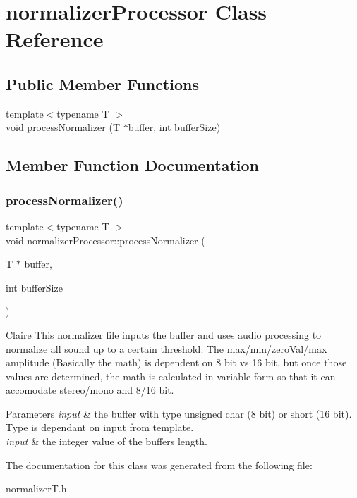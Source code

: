 \hypertarget{classnormalizerProcessor}{}\section{normalizer\+Processor Class Reference}
\label{classnormalizerProcessor}
\subsection*{Public Member Functions}
\begin{DoxyCompactItemize}
\item 
{\footnotesize template$<$typename T $>$ }\\void \hyperlink{classnormalizerProcessor_aea725ba0a175e3fd1e964f5381269a38}{process\+Normalizer} (T $\ast$buffer, int buffer\+Size)
\end{DoxyCompactItemize}


\subsection{Member Function Documentation}
\mbox{\label{classnormalizerProcessor_aea725ba0a175e3fd1e964f5381269a38}} 
\subsubsection{\texorpdfstring{process\+Normalizer()}{processNormalizer()}}
{\footnotesize\ttfamily template$<$typename T $>$ \\
void normalizer\+Processor\+::process\+Normalizer (\begin{DoxyParamCaption}\item[{T $\ast$}]{buffer,  }\item[{int}]{buffer\+Size }\end{DoxyParamCaption})\hspace{0.3cm}{\ttfamily [inline]}}

Claire This normalizer file inputs the buffer and uses audio processing to normalize all sound up to a certain threshold. The max/min/zero\+Val/max amplitude (Basically the math) is dependent on 8 bit vs 16 bit, but once those values are determined, the math is calculated in variable form so that it can accomodate stereo/mono and 8/16 bit. 
\begin{DoxyParams}{Parameters}
{\em input} & the buffer with type unsigned char (8 bit) or short (16 bit). Type is dependant on input from template. \\
\hline
{\em input} & the integer value of the buffer\textquotesingle{}s length. \\
\hline
\end{DoxyParams}


The documentation for this class was generated from the following file\+:\begin{DoxyCompactItemize}
\item 
normalizer\+T.\+h\end{DoxyCompactItemize}
